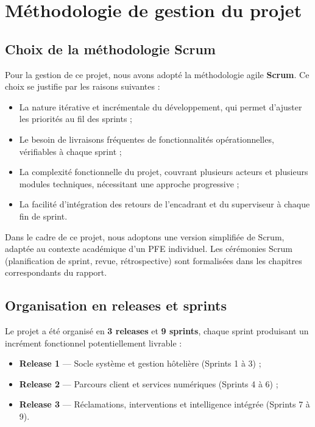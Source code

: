 \section{Méthodologie de gestion du projet}
\label{sec:methodologie}

\subsection{Choix de la méthodologie Scrum}

Pour la gestion de ce projet, nous avons adopté la méthodologie agile \textbf{Scrum}. Ce choix se justifie par les raisons suivantes :

\begin{itemize}
  \item La nature itérative et incrémentale du développement, qui permet d'ajuster les priorités au fil des sprints ;
  \item Le besoin de livraisons fréquentes de fonctionnalités opérationnelles, vérifiables à chaque sprint ;
  \item La complexité fonctionnelle du projet, couvrant plusieurs acteurs et plusieurs modules techniques, nécessitant une approche progressive ;
  \item La facilité d'intégration des retours de l'encadrant et du superviseur à chaque fin de sprint.
\end{itemize}

Dans le cadre de ce projet, nous adoptons une version simplifiée de Scrum, adaptée au contexte académique d'un PFE individuel. Les cérémonies Scrum (planification de sprint, revue, rétrospective) sont formalisées dans les chapitres correspondants du rapport.

\subsection{Organisation en releases et sprints}

Le projet a été organisé en \textbf{3 releases} et \textbf{9 sprints}, chaque sprint produisant un incrément fonctionnel potentiellement livrable :

\begin{itemize}
  \item \textbf{Release 1} — Socle système et gestion hôtelière (Sprints 1 à 3) ;
  \item \textbf{Release 2} — Parcours client et services numériques (Sprints 4 à 6) ;
  \item \textbf{Release 3} — Réclamations, interventions et intelligence intégrée (Sprints 7 à 9).
\end{itemize}

